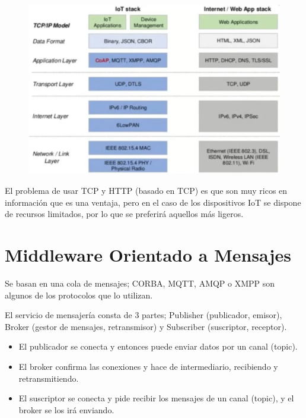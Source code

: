 \documentclass[12pt, twoside, openright]{report} %
\begin{document}
\begin{figure}[H]
	{\includegraphics[scale=.5]{2021-04-08 09_06_45-2021-04-07 17-01-12.mkv.png}}
\end{figure}

El problema de usar TCP y HTTP (basado en TCP) es que son muy ricos en información que es una ventaja, pero en el caso de los dispositivos IoT se dispone de recursos limitados, por lo que se preferirá aquellos más ligeros.

\section{Middleware Orientado a Mensajes}

Se basan en una cola de mensajes; CORBA, MQTT, AMQP o XMPP son algunos de los protocolos que lo utilizan.

El servicio de mensajería consta de 3 partes; Publisher (publicador, emisor), Broker (gestor de mensajes, retransmisor) y Subscriber (suscriptor, receptor).
\begin{itemize}
	\item El publicador se conecta y entonces puede enviar datos por un canal (topic).
	\item El broker confirma las conexiones y hace de intermediario, recibiendo y retransmitiendo.
	\item El suscriptor se conecta y pide recibir los mensajes de un canal (topic), y el broker se los irá enviando.
\end{itemize}
\end{document}
